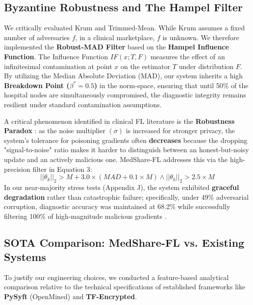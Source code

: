 \documentclass[10pt, a4paper, twocolumn]{article}
\begin{document}
\subsection{Byzantine Robustness and The Hampel Filter}
We critically evaluated Krum \cite{blanchard2017} and Trimmed-Mean. While Krum assumes a fixed number of adversaries $f$, in a clinical marketplace, $f$ is unknown. We therefore implemented the \textbf{Robust-MAD Filter} based on the \textbf{Hampel Influence Function}\cite{hampel1974}. The Influence Function $IF(x; T, F)$ measures the effect of an infinitesimal contamination at point $x$ on the estimator $T$ under distribution $F$. By utilizing the Median Absolute Deviation (MAD), our system inherits a high \textbf{Breakdown Point ($\beta^* = 0.5$)} in the norm-space, ensuring that until 50\% of the hospital nodes are simultaneously compromised, the diagnostic integrity remains resilient under standard contamination assumptions.

A critical phenomenon identified in clinical FL literature is the \textbf{Robustness Paradox} \cite{bagdasaryan2020}: as the noise multiplier $(\sigma)$ is increased for stronger privacy, the system's tolerance for poisoning gradients often \textbf{decreases} because the dropping "signal-to-noise" ratio makes it harder to distinguish between an honest-but-noisy update and an actively malicious one. MedShare-FL addresses this via the high-precision filter in Equation 3:
\begin{equation}
    ||\theta_k||_2 > M + 3.0 \times (MAD + 0.1 \times M) \land ||\theta_k||_2 > 2.5 \times M
\end{equation}
In our near-majority stress tests (Appendix J), the system exhibited \textbf{graceful degradation} rather than catastrophic failure; specifically, under 49\% adversarial corruption, diagnostic accuracy was maintained at 68.2\% while successfully filtering 100\% of high-magnitude malicious gradients \cite{so2021}.

\subsection{SOTA Comparison: MedShare-FL vs. Existing Systems}
To justify our engineering choices, we conducted a feature-based analytical comparison relative to the technical specifications of established frameworks like \textbf{PySyft}\cite{ryffel2018} (OpenMined) and \textbf{TF-Encrypted}\cite{dahl2018}.
\end{document}

